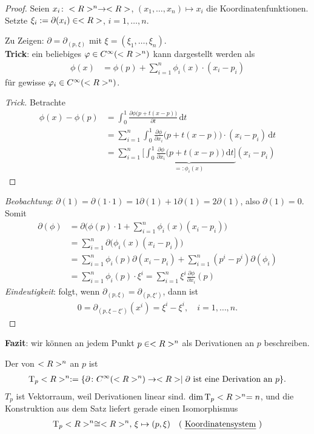 \begin{proof}
	Seien $x_i\colon<R>^n\to<R>$, $(x_1,\dots,x_n)\mapsto x_i$ die Koordinatenfunktionen. Setzte $\xi_i:=\partial(x_i)\in<R>$, $i=1,\dots,n$.
	
	Zu Zeigen: $\partial = \partial_{(p,\xi)}$ mit $\xi=(\xi_1,\dots,\xi_n)$.\\
	\textbf{Trick}: ein beliebiges $\varphi\in C^\infty(<R>^n)$ kann dargestellt werden als \begin{align*}
		\phi(x) &= \phi(p) + \sum_{i=1}^n \phi_i(x)\cdot (x_i-p_i)
	\end{align*}
	für gewisse $\varphi_i\in C^\infty(<R>^n)$.
	\begin{proof}[Trick]
		Betrachte \begin{align*}
			\phi(x)-\phi(p) &= \int_0^1\frac{\partial \phi\big(p+t(x-p)\big)}{\partial t}\,\mathrm dt \\
			&=\sum_{i=1}^n\int_0^1\frac{\partial\phi}{\partial x_i}\big( p+t(x-p)\big)\cdot(x_i-p_i)\,\mathrm dt\\
			&= \sum_{i=1}^n\underbrace{\bigg[\!\int_0^1 \frac{\partial\phi}{\partial x_i}\big(p+t(x-p)\big)\,\mathrm dt\!\bigg]}_{=:\phi_i(x)}(x_i-p_i)
		\end{align*}
	\end{proof}
	\emph{Beobachtung}: $\partial(1) = \partial(1\cdot 1) = 1\partial(1) + 1\partial(1) = 2\partial(1)$,  also $\partial(1) = 0$. Somit \begin{align*}
		\partial(\phi) &= \partial\Big(\phi(p)\cdot 1 + \sum_{i=1}^n\phi_i(x)(x_i-p_i)\Big) \\
		&=\sum_{i=1}^n \partial\big(\phi_i(x)(x_i-p_i)\big)\\
		&= \sum_{i=1}^n\phi_i(p)\partial(x_i-p_i) + \sum_{i=1}^n (p^i - p^i)\partial(\phi_i)\\
		&= \sum_{i=1}^n \phi_i(p)\cdot\xi^i = \sum_{i=1}^n \xi^i\frac{\partial\phi}{\partial x_i}(p)
	\end{align*}
	\emph{Eindeutigkeit}: folgt, wenn $\partial_{(p,\xi)} = \partial_{(p,\xi')}$, dann ist \begin{align*}
		0 = \partial_{(p,\xi - \xi')}(x^i) = \xi^i - \xi^i,\quad i=1,\dots,n.
	\end{align*}
\end{proof}

\textbf{Fazit}: wir können an jedem Punkt $p\in<R>^n$ als Derivationen an $p$ beschreiben.

\begin{definition}
	Der  von $<R>^n$ an $p$ ist \begin{align*}
		\operatorname{T}_p<R>^n := \{ \partial\colon C^\infty(<R>^n)\to<R>\mid \text{$\partial$ ist eine Derivation an $p$} \}.
	\end{align*}
	$T_p$ ist Vektorraum, weil Derivationen linear sind. $\dim\operatorname{T}_p<R>^n = n$, und die Konstruktion aus dem Satz liefert gerade einen Isomorphismus\begin{align*}
		\T_p\R^n\cong\R^n,\,\xi\mapsto(p,\xi)\quad(\text{\begriff{Koordinatensystem}\index{Koordinatensystem}})
	\end{align*}
\end{definition}

